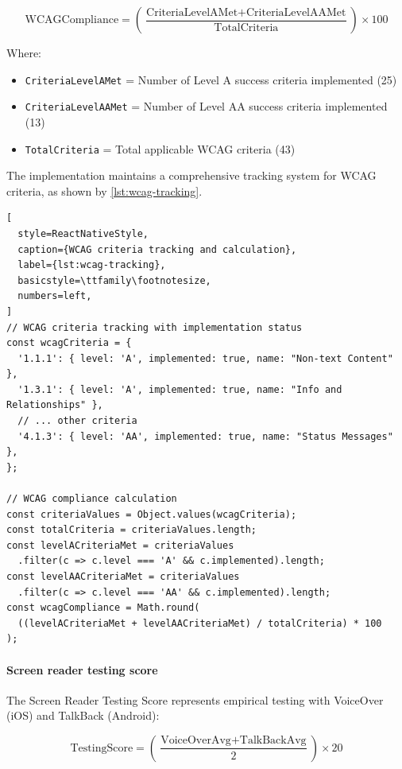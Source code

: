 \begin{equation}
\text{WCAGCompliance} 
= \left(\frac{\text{CriteriaLevelAMet} + \text{CriteriaLevelAAMet}}{\text{TotalCriteria}}\right) \times 100
\end{equation}

Where:
\begin{itemize}
    \item \texttt{CriteriaLevelAMet} = Number of Level A success criteria implemented (25)
    \item \texttt{CriteriaLevelAAMet} = Number of Level AA success criteria implemented (13)
    \item \texttt{TotalCriteria} = Total applicable WCAG criteria (43)
\end{itemize}

The implementation maintains a comprehensive tracking system for WCAG criteria, as shown by \ref{lst:wcag-tracking}.

\begin{lstlisting}[
  style=ReactNativeStyle,
  caption={WCAG criteria tracking and calculation},
  label={lst:wcag-tracking},
  basicstyle=\ttfamily\footnotesize,
  numbers=left,
]
// WCAG criteria tracking with implementation status
const wcagCriteria = {
  '1.1.1': { level: 'A', implemented: true, name: "Non-text Content" },
  '1.3.1': { level: 'A', implemented: true, name: "Info and Relationships" },
  // ... other criteria
  '4.1.3': { level: 'AA', implemented: true, name: "Status Messages" },
};

// WCAG compliance calculation
const criteriaValues = Object.values(wcagCriteria);
const totalCriteria = criteriaValues.length;
const levelACriteriaMet = criteriaValues
  .filter(c => c.level === 'A' && c.implemented).length;
const levelAACriteriaMet = criteriaValues
  .filter(c => c.level === 'AA' && c.implemented).length;
const wcagCompliance = Math.round(
  ((levelACriteriaMet + levelAACriteriaMet) / totalCriteria) * 100
);
\end{lstlisting}

\paragraph{Screen reader testing score}

The Screen Reader Testing Score represents empirical testing with VoiceOver (iOS) and TalkBack (Android):

\begin{equation}
\text{TestingScore} 
= \left(\frac{\text{VoiceOverAvg} + \text{TalkBackAvg}}{2}\right) \times 20
\end{equation}


